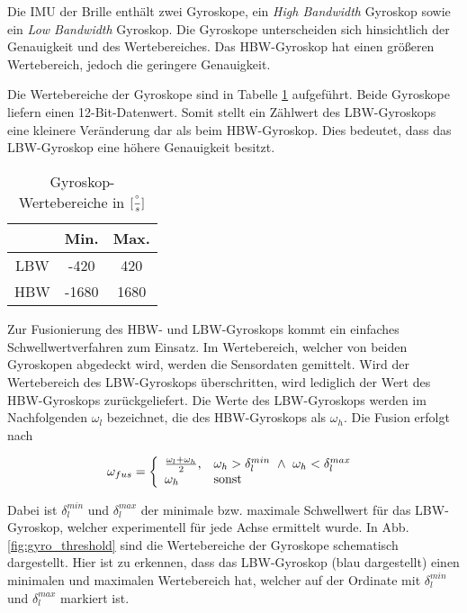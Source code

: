 Die \ac{IMU} der Brille enthält zwei
Gyroskope, ein \emph{High Bandwidth} Gyroskop sowie ein
\emph{Low Bandwidth} Gyroskop. Die Gyroskope unterscheiden sich
hinsichtlich der Genauigkeit und des Wertebereiches. Das \ac{HBW}-Gyroskop
hat einen größeren Wertebereich, jedoch die geringere
Genauigkeit.

Die Wertebereiche der Gyroskope sind
in Tabelle \ref{tab:ranges-gyros} aufgeführt. Beide Gyroskope liefern
einen 12-Bit-Datenwert. Somit stellt ein Zählwert des \ac{LBW}-Gyroskops eine
kleinere Veränderung dar als beim \ac{HBW}-Gyroskop.
Dies bedeutet, dass das \ac{LBW}-Gyroskop eine höhere Genauigkeit besitzt.

\begin{table}[ht]
  \centering
  \begin{tabular}{ | c | c | c | }
    \hline
    & Min. & Max. \\ \hline
    \ac{LBW} & -420   & 420   \\ \hline
    \ac{HBW} & -1680   & 1680   \\
    \hline
  \end{tabular}
  \caption{Gyroskop-Wertebereiche in $[{\degree \over s}]$}
  \label{tab:ranges-gyros}
\end{table}


Zur Fusionierung des \ac{HBW}- und \ac{LBW}-Gyroskops kommt ein einfaches Schwellwertverfahren zum Einsatz. 
Im Wertebereich, welcher von beiden Gyroskopen abgedeckt wird, werden
die Sensordaten gemittelt. Wird der Wertebereich des \ac{LBW}-Gyroskops
überschritten, wird lediglich der Wert des \ac{HBW}-Gyroskops
zurückgeliefert. Die Werte des \ac{LBW}-Gyroskops werden im
Nachfolgenden $\omega_{l}$ bezeichnet, die des \ac{HBW}-Gyroskops als
$\omega_{h}$. Die Fusion erfolgt nach

\begin{equation}
    \omega_{fus} = \left\{
    \begin{array}{ll}
        \frac{\omega_l + \omega_h}{2}, & \omega_h > \delta_l^{min}~ \land ~ \omega_h < \delta_l^{max}  \\
        \omega_h & \text{sonst}
    \end{array}\right. \\
\end{equation}

Dabei ist $\delta_l^{min}$ und $\delta_l^{max}$ der minimale bzw.
maximale Schwellwert für das LBW-Gyroskop, welcher experimentell für
jede Achse ermittelt wurde. In Abb. \ref{fig:gyro_threshold} sind
die Wertebereiche der Gyroskope schematisch dargestellt. Hier ist zu
erkennen, dass das LBW-Gyroskop (blau dargestellt) einen minimalen und
maximalen Wertebereich hat, welcher auf der Ordinate mit
$\delta_l^{min}$ und $\delta_l^{max}$ markiert ist.

